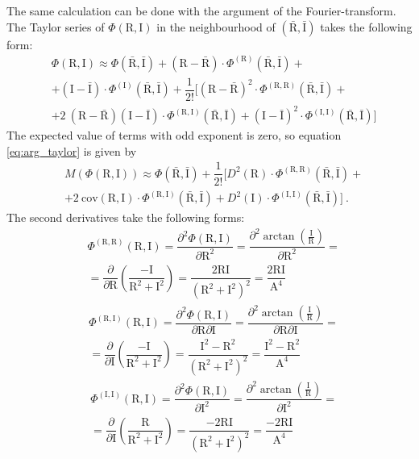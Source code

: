 \documentclass[a4paper,12pt,oneside]{article}
\newcommand{\Abs}{\mathrm{A}}
\newcommand{\Arg}{\Phi}
\newcommand{\R}{\mathrm{R}}
\newcommand{\I}{\mathrm{I}}
\begin{document}
The same calculation can be done with the argument of the Fourier-transform. The Taylor series of $\Arg(\R, \I)$ in the neighbourhood of $(\bar{\R}, \bar{\I})$ takes the following form:
\begin{eqnarray}\label{eq:arg_taylor}
  & \Arg(\R, \I) \approx \Arg(\bar{\R}, \bar{\I})
  + (\R-\bar{\R}) \cdot \Arg^{(\R)}(\bar{\R}, \bar{\I}) + \nonumber\\
  & + (\I-\bar{\I}) \cdot \Arg^{(\I)}(\bar{\R}, \bar{\I})
  + \dfrac{1}{2!} \Bigg[ (\R-\bar{\R})^2 \cdot \Arg^{(\R, \R)}(\bar{\R}, \bar{\I}) + \nonumber\\
  & + 2 \ (\R-\bar{\R})(\I-\bar{\I}) \cdot \Arg^{(\R, \I)}(\bar{\R}, \bar{\I}) +
  (\I-\bar{\I})^2 \cdot \Arg^{(\I, \I)}(\bar{\R}, \bar{\I}) \Bigg]
\end{eqnarray}
The expected value of terms with odd exponent is zero, so equation \eqref{eq:arg_taylor} is given by
\begin{eqnarray}\label{eq:exp_arg}
  & M \left( \Arg(\R, \I) \right) \approx \Arg(\bar{\R}, \bar{\I}) + \dfrac{1}{2!} \Bigg[ D^2(\R) \cdot \Arg^{(\R, \R)}(\bar{\R}, \bar{\I}) + \nonumber\\
  & + 2 \ \mathrm{cov}(\R, \I) \cdot \Arg^{(\R, \I)}(\bar{\R}, \bar{\I}) + D^2(\I) \cdot \Arg^{(\I, \I)}(\bar{\R}, \bar{\I}) \Bigg] \ .
\end{eqnarray}
The second derivatives take the following forms:
\begin{eqnarray}\label{eq:arg_rere}
  & \Arg^{(\R, \R)}(\R, \I) = \dfrac{\partial^2 \Arg(\R, \I)}{\partial \R^2} = 
  \dfrac{\partial^2 \arctan\left({\frac{\I}{\R}}\right) }{\partial \R^2} =  \nonumber\\
  & = \dfrac{\partial}{\partial \R} \left( \dfrac{-\I}{\R^2 + \I^2} \right) =
  \dfrac{2\R\I}{(\R^2 + \I^2)^{2}} = \dfrac{2\R\I}{\Abs^4}
\end{eqnarray}
\begin{eqnarray}\label{eq:arg_reim}
  & \Arg^{(\R, \I)}(\R, \I) = \dfrac{\partial^2 \Arg(\R, \I)}{\partial \R \partial \I} = 
  \dfrac{\partial^2 \arctan\left({\frac{\I}{\R}}\right) }{\partial \R \partial \I} =  \nonumber\\
  & = \dfrac{\partial}{\partial \I} \left( \dfrac{-\I}{\R^2 + \I^2} \right) =
  \dfrac{\I^2-\R^2}{(\R^2 + \I^2)^{2}} = \dfrac{\I^2-\R^2}{\Abs^4}
\end{eqnarray}
\begin{eqnarray}\label{eq:arg_imim}
  & \Arg^{(\I, \I)}(\R, \I) = \dfrac{\partial^2 \Arg(\R, \I)}{\partial \I^2} = 
  \dfrac{\partial^2 \arctan\left({\frac{\I}{\R}}\right) }{\partial \I^2} =  \nonumber\\
  & = \dfrac{\partial}{\partial \I} \left( \dfrac{\R}{\R^2 + \I^2} \right) =
  \dfrac{-2\R\I}{(\R^2 + \I^2)^{2}} = \dfrac{-2\R\I}{\Abs^4}
\end{eqnarray}
\end{document}
